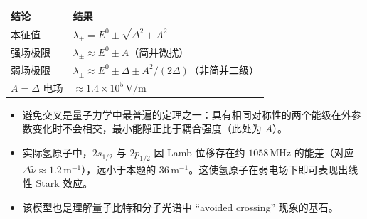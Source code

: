\begin{formulabox}[答案汇总]
\begin{center}
\begin{tabular}{ll}
\toprule
\textbf{结论} & \textbf{结果} \\
\midrule
本征值 & $\lambda_\pm=E^0\pm\sqrt{\Delta^2+A^2}$ \\
强场极限 & $\lambda_\pm\approx E^0\pm A$（简并微扰） \\
弱场极限 & $\lambda_\pm\approx E^0\pm\Delta\pm A^2/(2\Delta)$（非简并二级） \\
$A=\Delta$ 电场 & $\approx1.4\times10^5\,\text{V/m}$ \\
\bottomrule
\end{tabular}
\end{center}
\end{formulabox}

\begin{insightbox}[物理图像]
\begin{itemize}
    \item 避免交叉是量子力学中最普遍的定理之一：具有相同对称性的两个能级在外参数变化时不会相交，最小能隙正比于耦合强度（此处为 $A$）。
    \item 实际氢原子中，$2s_{1/2}$ 与 $2p_{1/2}$ 因 Lamb 位移存在约 $1058\,\text{MHz}$ 的能差（对应 $\Delta\tilde{\nu}\approx1.2\,\text{m}^{-1}$），远小于本题的 $36\,\text{m}^{-1}$。这使氢原子在弱电场下即可表现出线性 Stark 效应。
    \item 该模型也是理解量子比特和分子光谱中 ``avoided crossing'' 现象的基石。
\end{itemize}
\end{insightbox}
